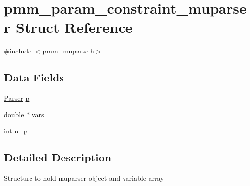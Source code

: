 \hypertarget{structpmm__param__constraint__muparser}{\section{pmm\-\_\-param\-\_\-constraint\-\_\-muparser Struct Reference}
\label{structpmm__param__constraint__muparser}
}


{\ttfamily \#include $<$pmm\-\_\-muparse.\-h$>$}

\subsection*{Data Fields}
\begin{DoxyCompactItemize}
\item 
\hyperlink{structParser}{Parser} \hyperlink{structpmm__param__constraint__muparser_a670f84c0b0d20f80250c52744886bd09}{p}
\item 
double $\ast$ \hyperlink{structpmm__param__constraint__muparser_ad85004e88259f4d0e9549babd77dfd2a}{vars}
\item 
int \hyperlink{structpmm__param__constraint__muparser_ad9d429b167ea7f345c0cda4e41ded404}{n\-\_\-p}
\end{DoxyCompactItemize}


\subsection{Detailed Description}
Structure to hold muparser object and variable array 

